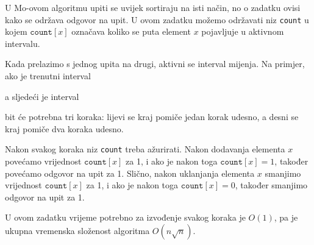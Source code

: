 U Mo-ovom algoritmu upiti se uvijek sortiraju
na isti način, no o zadatku ovisi
kako se održava odgovor na upit.
U ovom zadatku možemo održavati niz
\texttt{count} u kojem $\texttt{count}[x]$
označava koliko se puta element $x$
pojavljuje u aktivnom intervalu.

Kada prelazimo s jednog upita na drugi,
aktivni se interval mijenja.
Na primjer, ako je trenutni interval
\begin{center}
\end{center}
a sljedeći je interval
\begin{center}
\end{center}
bit će potrebna tri koraka:
lijevi se kraj pomiče jedan korak udesno,
a desni se kraj pomiče dva koraka udesno.

Nakon svakog koraka niz \texttt{count}
treba ažurirati.
Nakon dodavanja elementa $x$
povećamo vrijednost
$\texttt{count}[x]$ za 1,
i ako je nakon toga $\texttt{count}[x]=1$,
također povećamo odgovor na upit za 1.
Slično, nakon uklanjanja elementa $x$
smanjimo vrijednost
$\texttt{count}[x]$ za 1,
i ako je nakon toga $\texttt{count}[x]=0$,
također smanjimo odgovor na upit za 1.

U ovom zadatku vrijeme potrebno za izvođenje
svakog koraka je $O(1)$, pa je ukupna vremenska složenost
algoritma $O(n \sqrt n)$.